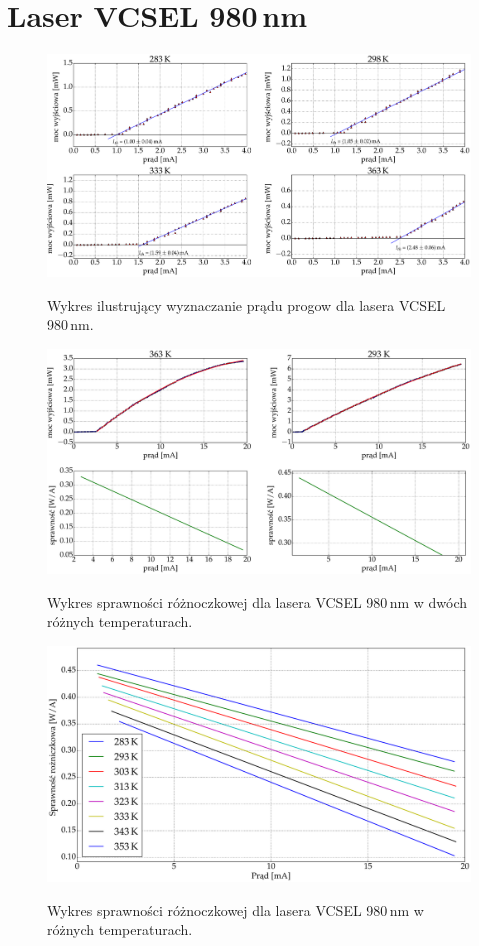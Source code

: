 \section{Laser VCSEL 980\,nm}
\begin{figure}
\center
  \includegraphics[scale=0.30]{plot980/plot_fit_i_th4.eps}
  \label{rys1}
  \caption{Wykres ilustrujący wyznaczanie prądu progow dla lasera VCSEL 980\,nm.}
\end{figure}
\begin{figure}
\center
  \includegraphics[scale=0.30]{plot980/plot_eff_via_current4.eps}
  \label{rys1}
  \caption{Wykres sprawności różnoczkowej dla lasera VCSEL 980\,nm w dwóch różnych temperaturach.}
\end{figure}
\begin{figure}
\center
  \includegraphics[scale=0.30]{plot980/plot_eff_via_current_all.eps}
  \label{rys1}
  \caption{Wykres sprawności różnoczkowej dla lasera VCSEL 980\,nm w różnych temperaturach.}
\end{figure}